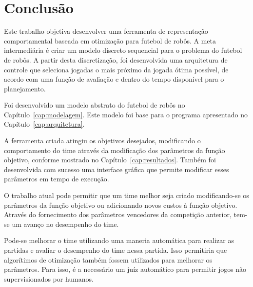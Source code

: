 \chapter{Conclusão}\label{cap:conclusao}


Este trabalho objetiva desenvolver uma ferramenta de representação
comportamental baseada em otimização para futebol de robôs.  A meta
intermediária é criar um modelo discreto sequencial para o problema do futebol
de robôs. A partir desta discretização, foi desenvolvida uma arquitetura de
controle que seleciona jogadas o mais próximo da jogada ótima possível, de
acordo com uma função de avaliação e dentro do tempo disponível para o
planejamento.

Foi desenvolvido um modelo abstrato do futebol de robôs no
Capítulo~\ref{cap:modelagem}. Este modelo foi base para o programa apresentado
no Capítulo~\ref{cap:arquitetura}.

A ferramenta criada atingiu os objetivos desejados, modificando o comportamento
do time através da modificação dos parâmetros da função objetivo, conforme
mostrado no Capítulo~\ref{cap:resultados}. Também foi desenvolvida com sucesso
uma interface gráfica que permite modificar esses parâmetros em tempo de
execução.

O trabalho atual pode permitir que um time melhor seja criado modificando-se os
parâmetros da função objetivo ou adicionando novos custos à função objetivo.
Através do fornecimento dos parâmetros vencedores da competição anterior, tem-se
um avanço no desempenho do time.

Pode-se melhorar o time utilizando uma maneria automática para realizar as
partidas e avaliar o desempenho do time nessa partida. Isso permitiria que
algorítimos de otimização também fossem utilizados para melhorar os parâmetros.
Para isso, é a necessário um juíz automático para permitir jogos não
supervisionados por humanos.

